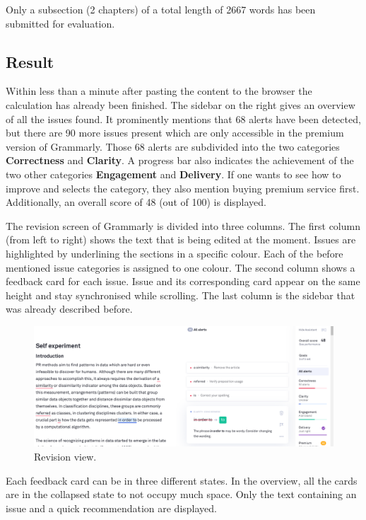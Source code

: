 \documentclass[runningheads]{llncs}
\let\OldTextregistered\textregistered
\renewcommand{\textregistered}{\OldTextregistered\xspace}
\begin{document}
Only a subsection (2 chapters) of a total length of 2667 words has been submitted for evaluation.

\subsection{Result}
Within less than a minute after pasting the content to the browser the calculation has already been finished. The sidebar on the right gives an overview of all the issues found. It prominently mentions that 68 alerts have been detected, but there are 90 more issues present which are only accessible in the premium version of Grammarly\textregistered. Those 68 alerts are subdivided into the two categories \textbf{Correctness} and \textbf{Clarity}. A progress bar also indicates the achievement of the two other categories \textbf{Engagement} and \textbf{Delivery}. If one wants to see how to improve and selects the category, they also mention buying premium service first. Additionally, an overall score of 48 (out of 100) is displayed.

The revision screen of Grammarly\textregistered is divided into three columns. The first column (from left to right) shows the text that is being edited at the moment. Issues are highlighted by underlining the sections in a specific colour. Each of the before mentioned issue categories is assigned to one colour. The second column shows a feedback card for each issue. Issue and its corresponding card appear on the same height and stay synchronised while scrolling. The last column is the sidebar that was already described before. 

\begin{figure}[H]
  \includegraphics[width=\linewidth]{images/view.png}
  \caption{Revision view.}
  \label{fig:revision}
\end{figure}

Each feedback card can be in three different states. In the overview, all the cards are in the collapsed state to not occupy much space. Only the text containing an issue and a quick recommendation are displayed.
\end{document}
